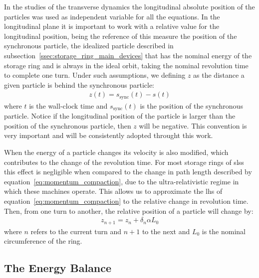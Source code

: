	In the studies of the transverse dynamics the longitudinal absolute position of the particles was used as independent variable for all the equations. In the longitudinal plane it is important to work with a relative value for the longitudinal position, being the reference of this measure the position of the synchronous particle, the idealized particle described in subsection~\ref{ssec:storage_ring_main_devices} that has the nominal energy of the storage ring and is always in the ideal orbit, taking the nominal revolution time to complete one turn. Under such assumptions, we defining $z$ as the distance a given particle is behind the synchronous particle:
	\begin{align}\label{eq:longitudinal_deviations}
		z(t) = s_\text{sync}(t) - s(t)
	\end{align}
	where $t$ is the wall-clock time and $s_\text{sync}(t)$ is the position of the synchronous particle. Notice if the longitudinal position of the particle is larger than the position of the synchronous particle, then $z$ will be negative. This convention is very important and will be consistently adopted throught this work.

    When the energy of a particle changes its velocity is also modified, which contributes to the change of the revolution time. For most storage rings of \gls{sls}s this effect is negligible when compared to the change in path length described by equation~\eqref{eq:momentum_compaction}, due to the ultra-relativistic regime in which these machines operate. This allows us to approximate the \gls{lhs} of equation~\eqref{eq:momentum_compaction} to the relative change in revolution time. Then, from one turn to another, the relative position of a particle will change by:
	\begin{align}\label{eq:revolution_time_variation}
		z_{n+1} = z_n + \delta_n\alpha L_0
	\end{align}
	where $n$ refers to the current turn and $n+1$ to the next and $L_0$ is the nominal circumference of the ring.

	\subsection{The Energy Balance}

